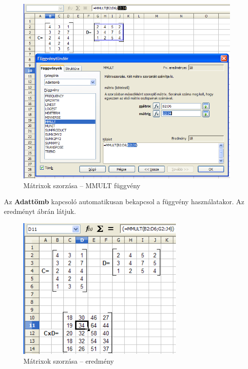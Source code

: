\begin{figure}[!h]
\begin{center}
\includegraphics[width=13.999cm]{oocalcv1-img133.png}
\caption{Mátrixok szorzása -- MMULT függvény}\label{MátrixokSzorzásaMMULT}
\end{center}
\end{figure}

Az \textbf{Adattömb} kapcsoló automatikusan bekapcsol a függvény
használatakor. Az eredményt  ábrán látjuk.

\begin{figure}[!h]
\begin{center}
\includegraphics[width=8.285cm]{oocalcv1-img134.png}
\caption{Mátrixok szorzása -- eredmény}\label{MátrixokSzorzásaEredmény}
\end{center}
\end{figure}



